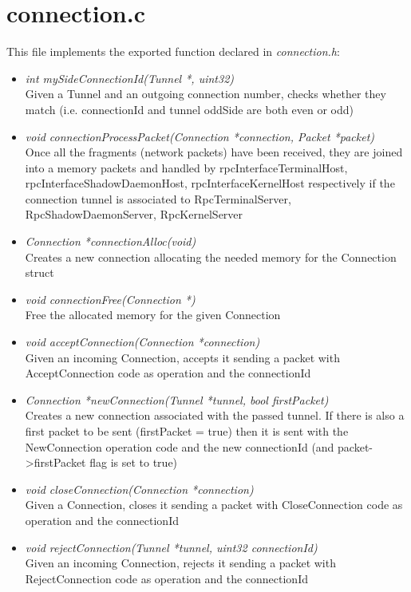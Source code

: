 \section{connection.c} 
This file implements the exported function declared in \emph{connection.h}:

\begin{itemize}

	\item \emph{int mySideConnectionId(Tunnel *, uint32)}
	\\Given a Tunnel and an outgoing connection number, checks whether they match (i.e. connectionId and tunnel oddSide are both even or odd)

	\item \emph{void connectionProcessPacket(Connection *connection, Packet *packet)}
	\\Once all the fragments (network packets) have been received, they are joined into a memory packets and handled by rpcInterfaceTerminalHost, rpcInterfaceShadowDaemonHost, rpcInterfaceKernelHost respectively if the connection tunnel is associated to RpcTerminalServer, RpcShadowDaemonServer, RpcKernelServer
	
	\item \emph{Connection *connectionAlloc(void)}
	\\Creates a new connection allocating the needed memory for the Connection struct
	
	\item \emph{void connectionFree(Connection *)}
	\\Free the allocated memory for the given Connection
	
	\item \emph{void acceptConnection(Connection *connection)}
	\\Given an incoming Connection, accepts it sending a packet with AcceptConnection code as operation and the connectionId 
	
	\item \emph{Connection *newConnection(Tunnel *tunnel, bool firstPacket)}
	\\Creates a new connection associated with the passed tunnel. If there is also a first packet to be sent (firstPacket = true) then it is sent with the NewConnection operation code and the new connectionId (and packet->firstPacket flag is set to true)
	
	\item \emph{void closeConnection(Connection *connection)}
	\\Given a Connection, closes it sending a packet with CloseConnection code as operation and the connectionId
	
	\item \emph{void rejectConnection(Tunnel *tunnel, uint32 connectionId)}
	\\Given an incoming Connection, rejects it sending a packet with RejectConnection code as operation and the connectionId
	
\end{itemize}

